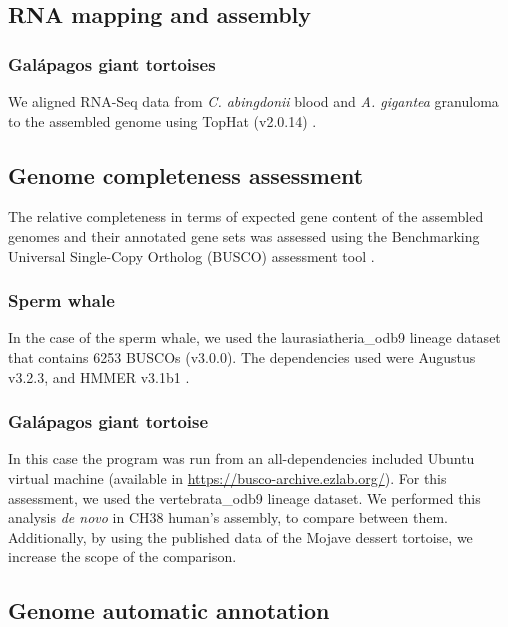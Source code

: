 \subsection{RNA mapping and assembly} \label{ss_matmet_bioinformatics_rna_assembly}

\subsubsection*{Gal\'{a}pagos giant tortoises}

We aligned RNA-Seq data from \textit{C. abingdonii} blood and \textit{A. gigantea} granuloma to the assembled genome using TopHat (v2.0.14) \cite{Trapnell2009}.

\subsection{Genome completeness assessment} \label{ss_matmet_bioinformatics_genome_completeness}

The relative completeness in terms of expected gene content of the assembled genomes and their annotated gene sets was assessed using the Benchmarking Universal Single-Copy Ortholog (BUSCO) assessment tool \cite{Seppey2019}.

\subsubsection*{Sperm whale}

In the case of the sperm whale, we used the laurasiatheria\_odb9 lineage dataset that contains 6253 BUSCOs (v3.0.0).
The dependencies used were Augustus v3.2.3, and HMMER v3.1b1 \cite{Eddy2011}.

\subsubsection*{Gal\'{a}pagos giant tortoise}

In this case the program was run from an all-dependencies included Ubuntu virtual machine (available in \href{https://busco-archive.ezlab.org/}{https://busco-archive.ezlab.org/}).
For this assessment, we used the vertebrata\_odb9 lineage dataset.
We performed this analysis \textit{de novo} in CH38 human's assembly, to compare between them.
Additionally, by using the published data of the Mojave dessert tortoise, we increase the scope of the comparison.

\subsection{Genome automatic annotation} \label{ss_matmet_bioinformatics_automatic_annotation}

